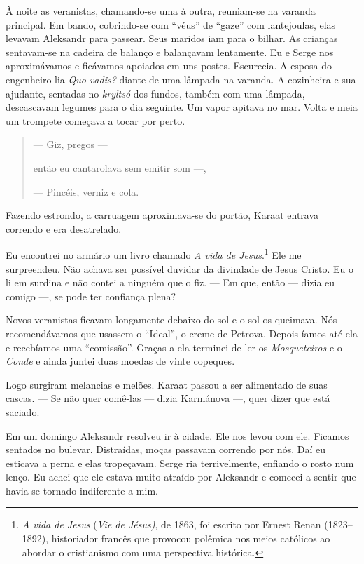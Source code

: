 À noite as veranistas, chamando-se uma à outra, reuniam-se na varanda
principal. Em bando, cobrindo-se com ``véus'' de ``gaze'' com
lantejoulas, elas levavam Aleksandr para passear. Seus maridos iam para
o bilhar. As crianças sentavam-se na cadeira de balanço e balançavam
lentamente. Eu e Serge nos aproximávamos e ficávamos apoiados em uns
postes. Escurecia. A esposa do engenheiro lia \emph{Quo vadis?} diante
de uma lâmpada na varanda. A cozinheira e sua ajudante, sentadas no
\emph{kryltsó} dos fundos, também com uma lâmpada, descascavam legumes
para o dia seguinte. Um vapor apitava no mar. Volta e meia um trompete
começava a tocar por perto.

\begin{quotation}
--- Giz, pregos ---

então eu cantarolava sem emitir som ---,

--- Pincéis, verniz e cola.
\end{quotation}

Fazendo estrondo, a carruagem aproximava-se do portão, Karaat entrava
correndo e era desatrelado.

Eu encontrei no armário um livro chamado \emph{A vida de
Jesus}.\footnote{\emph{A vida de Jesus} (\emph{Vie de Jésus)}, de 1863,
  foi escrito por Ernest Renan (1823--1892), historiador francês que
  provocou polêmica nos meios católicos ao abordar o cristianismo com
  uma perspectiva histórica.} Ele me surpreendeu. Não achava ser
possível duvidar da divindade de Jesus Cristo. Eu o li em surdina e não
contei a ninguém que o fiz. --- Em que, então --- dizia eu comigo ---,
se pode ter confiança plena?

Novos veranistas ficavam longamente debaixo do sol e o sol os queimava.
Nós recomendávamos que usassem o ``Ideal'', o creme de Petrova. Depois
íamos até ela e recebíamos uma ``comissão''. Graças a ela terminei de
ler os \emph{Mosqueteiros} e o \emph{Conde} e ainda juntei duas moedas
de vinte copeques.

Logo surgiram melancias e melões. Karaat passou a ser alimentado de suas
cascas. --- Se não quer comê-las --- dizia Karmánova ---, quer dizer que
está saciado.

Em um domingo Aleksandr resolveu ir à cidade. Ele nos levou com ele.
Ficamos sentados no bulevar. Distraídas, moças passavam correndo por
nós. Daí eu esticava a perna e elas tropeçavam. Serge ria terrivelmente,
enfiando o rosto num lenço. Eu achei que ele estava muito atraído por
Aleksandr e comecei a sentir que havia se tornado indiferente a mim.


